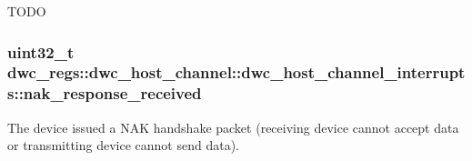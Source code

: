 T\-O\-D\-O \hypertarget{uniondwc__regs_1_1dwc__host__channel_1_1dwc__host__channel__interrupts_a0727e2cb21b4ac3806de17ad35ac50eb}{
\subsubsection[{nak\-\_\-response\-\_\-received}]{\setlength{\rightskip}{0pt plus 5cm}uint32\-\_\-t dwc\-\_\-regs\-::dwc\-\_\-host\-\_\-channel\-::dwc\-\_\-host\-\_\-channel\-\_\-interrupts\-::nak\-\_\-response\-\_\-received}}\label{uniondwc__regs_1_1dwc__host__channel_1_1dwc__host__channel__interrupts_a0727e2cb21b4ac3806de17ad35ac50eb}
The device issued a N\-A\-K handshake packet (receiving device cannot accept data or transmitting device cannot send data).

